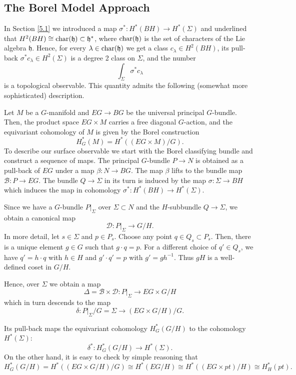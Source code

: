 \documentclass[11pt]{report}
\theoremstyle{plain}
\theoremstyle{definition}
\theoremstyle{remark}
\theoremstyle{remark}
\numberwithin{equation}{section}
\begin{document}
\subsection{The Borel Model Approach}

In Section \ref{5.1}  we introduced a map $\sigma^*: H^*(BH) \to H^*(\Sigma)$
and underlined that $H^2(BH) \cong {\rm char}(\mathfrak{h}) \subset \mathfrak{h}^*$, where ${\rm char}(\mathfrak{h})$ is the set of characters of the Lie algebra $\mathfrak{h}$. Hence, for every $\lambda \in {\rm char}(\mathfrak{h})$ we get a class $c_\lambda \in H^2(BH)$, its pull-back $\sigma^* c_\lambda \in H^2(\Sigma)$ is a degree 2 class on $\Sigma$, and the number 
%
$$
\int_\Sigma \sigma^* c_\lambda
$$
is a topological observable. This quantity admits the following (somewhat more sophisticated) description.

Let $M$ be a $G$-manifold and $EG \to BG$ be the universal principal $G$-bundle. Then, the product space $EG \times M$ carries a free diagonal $G$-action, and the equivariant cohomology of $M$ is given by the Borel construction
%
$$
H^*_G(M)=H^*((EG\times  M)/G).
$$
To describe our surface observable we start with  the Borel classifying bundle and construct a sequence of maps.
The principal $G$-bundle $P \to N$ is obtained as a pull-back of $EG$ under a map $\beta: N \to BG$. The map $\beta$ lifts to the bundle map $\mathcal{B}: P \to EG$. 
The bundle $Q \to \Sigma$ in its turn is induced by the map $\sigma: \Sigma \to BH$ which induces the map in cohomology $\sigma^*: H^*(BH) \to H^*(\Sigma)$.

Since we have a $G$-bundle $P|_\Sigma$ over $\Sigma \subset N$ and the $H$-subbundle $Q \to \Sigma$, we obtain a canonical map
%
$$
\mathcal{D}: P|_\Sigma \to G/H .
$$
In more detail, let $s \in \Sigma$ and $p \in P_s$. Choose any point $q \in Q_s \subset P_s$. Then, there is a unique element $g \in G$ such that $g \cdot q = p$. For a different choice of $q' \in Q_s$, we have $q'=h \cdot q$ with $h \in H$ and $g' \cdot q' = p$ with $g'=gh^{-1}$. Thus $gH$ is a well-defined coset in $G/H$. 

 Hence, over $\Sigma$ we obtain a map 
%
$$
\Delta = \mathcal{B} \times \mathcal{D}: P|_\Sigma \to EG \times G/H
$$
which in turn descends to the map
%
$$
\delta: P|_\Sigma/G = \Sigma \to (EG \times G/H)/G.
$$

Its pull-back  maps the equivariant cohomology $H^*_G(G/H)$ to the cohomology $H^*(\Sigma)$:
$$
\delta^* :  H^*_G(G/H) \to H^*(\Sigma). 
$$ 
%
On the other hand, it is easy to check by simple reasoning that 
$$
H^*_G(G/H) = H^*((EG\times  G/H)/G)\cong H^*(EG/H) \cong H^*((EG \times pt)/H) \cong H^*_H(pt).
$$
\end{document}
